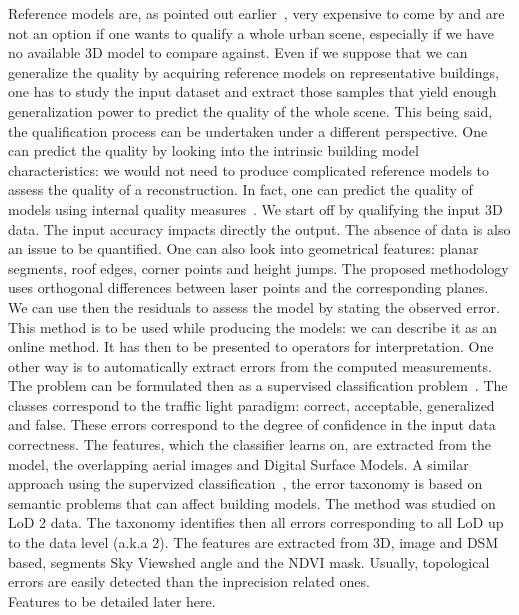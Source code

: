 \documentclass[../main.tex]{subfiles}
\begin{document}
    Reference models are, as pointed out earlier~\cite{Schuster2003}, very expensive to come by and are not an option if one wants to qualify a whole urban scene, especially if we have no available 3D model to compare against. Even if we suppose that we can generalize the quality by acquiring reference models on representative buildings, one has to study the input dataset and extract those samples that yield enough generalization power to predict the quality of the whole scene. This being said, the qualification process can be undertaken under a different perspective. One can predict the quality by looking into the intrinsic building model characteristics: we would not need to produce complicated reference models to assess the quality of a reconstruction. In fact, one can predict the quality of models using internal quality measures~\cite{OudeElberink2010}. We start off by qualifying the input 3D data. The input accuracy impacts directly the output. The absence of data is also an issue to be quantified. One can also look into geometrical features: planar segments, roof edges, corner points and height jumps. The proposed methodology uses orthogonal differences between laser points and the corresponding planes. We can use then the residuals to assess the model by stating the observed error. This method is to be used while producing the models: we can describe it as an online method. It has then to be presented to operators for interpretation. One other way is to automatically extract errors from the computed measurements. The problem can be formulated then as a supervised classification problem~\cite{Boudet2006}. The classes correspond to the traffic light paradigm: correct, acceptable, generalized and false. These errors correspond to the degree of confidence in the input data correctness. The features, which the classifier learns on, are extracted from the model, the overlapping aerial images and Digital Surface Models. A similar approach using the supervized classification~\cite{michelin2013quality}, the error taxonomy is based on semantic problems that can affect building models. The method was studied on LoD 2 data. The taxonomy identifies then all errors corresponding to all LoD up to the data level (a.k.a 2). The features are extracted from 3D, image and DSM based, segments Sky Viewshed angle and the NDVI mask. Usually, topological errors are easily detected than the inprecision related ones.\\

    {\color{red} Features to be detailed later here.\\}
\end{document}

